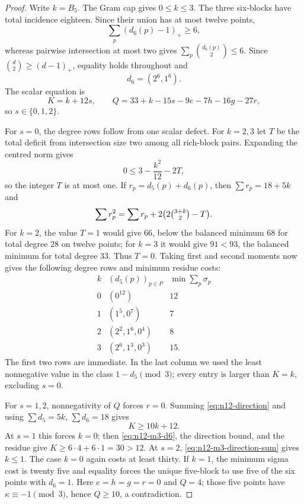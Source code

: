 \begin{proof}
Write $k=B_5$.  The Gram cap gives $0\le k\le3$.  The three six-blocks
have total incidence eighteen.  Since their union has at most twelve
points,
\[
 \sum_p(d_6(p)-1)_+\ge6,
\]
whereas pairwise intersection at most two gives
$\sum_p\binom{d_6(p)}2\le6$.  Since
$\binom d2\ge(d-1)_+$, equality holds throughout and
\begin{equation}\label{eq:n12-m3-d6}
 d_6=(2^6,1^6).
\end{equation}
The scalar equation is
\[
 K=k+12s,\qquad
 Q=33+k-15s-9e-7h-16g-27r,
\]
so $s\in\{0,1,2\}$.

For $s=0$, the degree rows follow from one scalar defect.  For $k=2,3$ let
$T$ be the total deficit from intersection size two among all rich-block
pairs.  Expanding the centred norm gives
\[
 0\le3-\frac{k^2}{12}-2T,
\]
so the integer $T$ is at most one.  If $r_p=d_5(p)+d_6(p)$, then
$\sum r_p=18+5k$ and
\[
 \sum r_p^2=\sum r_p+2\bigl(2\tbinom{3+k}{2}-T\bigr).
\]
For $k=2$, the value $T=1$ would give $66$, below the balanced minimum
$68$ for total degree $28$ on twelve points; for $k=3$ it would give
$91<93$, the balanced minimum for total degree $33$.  Thus $T=0$.
Taking first and second moments now gives the following degree rows and
minimum residue costs:
\[
\begin{array}{c|c|c}
k&(d_5(p))_{p\in P}&\min\sum_p\sigma_p\\ \hline
0&(0^{12})&12\\
1&(1^5,0^7)&7\\
2&(2^2,1^6,0^4)&8\\
3&(2^6,1^3,0^3)&15.
\end{array}
\]
The first two rows are immediate.  In the last column we used the least
nonnegative value in the class $1-d_5\pmod3$; every entry is larger than
$K=k$, excluding $s=0$.

For $s=1,2$, nonnegativity of $Q$ forces $r=0$.  Summing
\eqref{eq:n12-direction} and using
$\sum d_5=5k$, $\sum d_6=18$ gives
\begin{equation}\label{eq:n12-m3-direction-sum}
 K\ge10k+12.
\end{equation}
At $s=1$ this forces $k=0$; then \eqref{eq:n12-m3-d6}, the direction
bound, and the residue give $K\ge6\cdot4+6\cdot1=30>12$.
At $s=2$, \eqref{eq:n12-m3-direction-sum} gives $k\le1$.  The case $k=0$
again costs at least thirty.  If $k=1$, the minimum sigma cost is twenty
five and equality forces the unique five-block to use five of the six
points with $d_6=1$.  Here $e=h=g=r=0$ and $Q=4$; those five points have
$\kappa\equiv-1\pmod3$, hence $Q\ge10$, a contradiction.
\end{proof}

